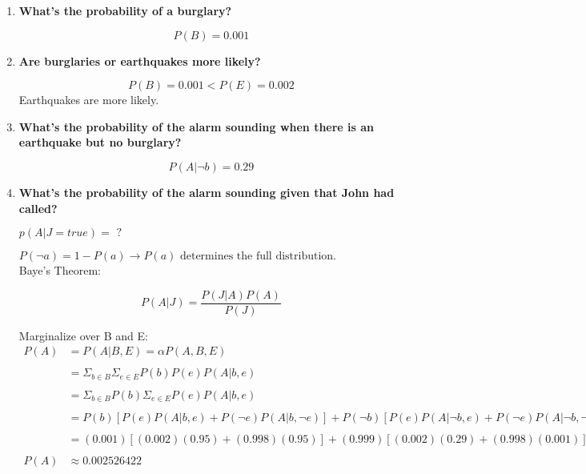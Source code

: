 
\usepackage{algorithm}
\usepackage{listings}
\usepackage{graphicx,amssymb,amsmath}
\usepackage{epstopdf}
\sloppy


\oddsidemargin 0in
\evensidemargin 0in
\textwidth 6.5in
\topmargin -0.5in
\textheight 9.0in




\pagestyle{myheadings}  %

\begin{enumerate}

	\item{\bf What's the probability of a burglary?}
	
	\[
		P(B) = 0.001
	\]
	
	\item{\bf Are burglaries or earthquakes more likely?}
	
	\[
		P(B) = 0.001 < P(E) = 0.002
	\]
	Earthquakes are more likely.
	
	\item{\bf What's the probability of the alarm sounding when there is an earthquake but no burglary?}
	
	\[
		P( A | \neg b ) = 0.29
	\]
	
	\item{\bf What's the probability of the alarm sounding given that John had called?}

	\(
		p(A | J = true ) = \text{ ?}
	\)
	
	\(
		P(\neg a ) = 1 - P(a) \rightarrow P(a) \text{ determines the full distribution.}
	\) \\
	
	Baye's Theorem:
	
	\[
		P(A|J) = \frac{P(J|A)P(A)}{P(J)}
	\]
	
	Marginalize over B and E: \\
	
	\(
		\begin{array}{ll}
			P(A) & = P(A|B,E) = \alpha P(A,B,E) \\ \\
				& = \Sigma_{b \in B} \Sigma_{e \in E} P(b) P(e) P(A|b,e) \\ \\
				& = \Sigma_{b \in B} P(b) \Sigma_{e \in E} P(e) P(A | b,e) \\ \\
				& = P(b)[P(e) P(A | b, e) + P(\neg e) P(A | b, \neg e)] + P(\neg b)[P(e) P(A | \neg b, e) + P(\neg e) P(A | \neg b, \neg e)] \\ \\
				& = (0.001) [ (0.002) (0.95) + (0.998) (0.95) ] + (0.999) [ (0.002) (0.29) + (0.998) (0.001) ] \\ \\
			P(A) & \approx 0.002526422 
		\end{array}
	\) \\
	

\end{enumerate}
